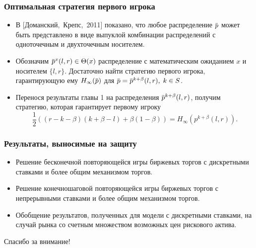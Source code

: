 \documentclass[12pt]{beamer}
\newcommand{\overbar}[1]{\mkern 1.5mu\overline{\mkern-1.3mu#1\mkern-1.3mu}\mkern 1.3mu}
\newcommand{\Co}{\beta}
\newcommand{\p}{\overbar{p}}
\newcommand{\High}[1][\ensuremath{\infty}]{\ensuremath{H_{#1}}}
\begin{document}
\begin{frame}
  \frametitle{Оптимальная стратегия первого игрока}
  \begin{itemize}
  \item 
    В [Доманский,~Крепс,~2011] показано, что любое распределение $\p$ может быть представлено в виде выпуклой комбинации распределений с одноточечным и двухточечным носителем.
  \item
    Обозначим $\p^x(l, r) \in \Theta(x)$ распределение с математическим ожиданием $x$ и носителем $\{l, r\}$.
    Достаточно найти стратегию первого игрока, гарантирующую ему $\High(\p)$ для $\p = \p^{k+\beta}(l,r), \; k \in S$.
  \item
    Перенося результаты главы 1 на распределения $\p^{k+\Co}(l, r)$, получим стратегию, которая гарантирует первому игроку
    \begin{equation*}
      \frac{1}{2}((r-k-\beta)(k+\beta-l) + \beta(1-\beta)) = \High[\infty](p^{k+\Co}(l, r)).
    \end{equation*}
  \end{itemize}
\end{frame}

\begin{frame}
\frametitle{Результаты, выносимые на защиту}
\begin{itemize}
\item
  Решение бесконечной повторяющейся игры биржевых торгов с дискретными ставками и более общим механизмом торгов.
\item
  Решение конечношаговой повторяющейся игры биржевых торгов с непрерывными ставками и более общим механизмом торгов.
\item
  Обобщение результатов, полученных для модели с дискретными ставками, на случай рынка со счетным множеством возможных цен рискового актива.
\end{itemize}
\end{frame}
  
\begin{frame}
  \begin{center}
    Спасибо за внимание!
  \end{center}
\end{frame}
\end{document}
